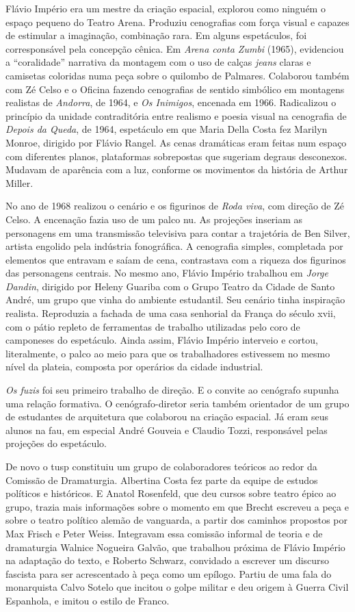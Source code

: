 Flávio Império era um mestre da criação espacial, explorou como ninguém
o espaço pequeno do Teatro Arena. Produziu cenografias com força visual
e capazes de estimular a imaginação, combinação rara. Em alguns
espetáculos, foi corresponsável pela concepção cênica. Em {\it Arena
conta Zumbi} (1965), evidenciou a “coralidade” narrativa da montagem com
o uso de calças {\it jeans} claras e camisetas coloridas numa peça sobre
o quilombo de Palmares. Colaborou também com Zé Celso e o Oficina
fazendo cenografias de sentido simbólico em montagens realistas de
{\it Andorra}, de 1964, e {\it Os Inimigos}, encenada em 1966.
Radicalizou o princípio da unidade contraditória entre realismo e poesia
visual na cenografia de {\it Depois da Queda}, de 1964, espetáculo em
que Maria Della Costa fez Marilyn Monroe, dirigido por Flávio Rangel. As
cenas dramáticas eram feitas num espaço com diferentes planos,
plataformas sobrepostas que sugeriam degraus desconexos. Mudavam de
aparência com a luz, conforme os movimentos da história de Arthur
Miller.

No ano de 1968 realizou o cenário e os figurinos de {\it Roda viva}, com
direção de Zé Celso. A encenação fazia uso de um palco nu. As projeções
inseriam as personagens em uma transmissão televisiva para contar a
trajetória de Ben Silver, artista engolido pela indústria fonográfica. A
cenografia simples, completada por elementos que entravam e saíam de
cena, contrastava com a riqueza dos figurinos das personagens centrais.
No mesmo ano, Flávio Império trabalhou em {\it Jorge Dandin}, dirigido
por Heleny Guariba com o Grupo Teatro da Cidade de Santo André, um grupo
que vinha do ambiente estudantil. Seu cenário tinha inspiração realista.
Reproduzia a fachada de uma casa senhorial da França do século {\sc xvii}, com
o pátio repleto de ferramentas de trabalho utilizadas pelo coro de
camponeses do espetáculo. Ainda assim, Flávio Império interveio e
cortou, literalmente, o palco ao meio para que os trabalhadores
estivessem no mesmo nível da plateia, composta por operários da cidade
industrial.

{\it Os fuzis} foi seu primeiro trabalho de direção. E o convite ao
cenógrafo supunha uma relação formativa. O cenógrafo-diretor seria
também orientador de um grupo de estudantes de arquitetura que colaborou
na criação espacial. Já eram seus alunos na {\sc fau}, em especial André
Gouveia e Claudio Tozzi, responsável pelas projeções do espetáculo.

De novo o {\sc tusp} constituiu um grupo de colaboradores teóricos ao redor da
Comissão de Dramaturgia. Albertina Costa fez parte da equipe de estudos
políticos e históricos. E Anatol Rosenfeld, que deu cursos sobre teatro
épico ao grupo, trazia mais informações sobre o momento em que Brecht
escreveu a peça e sobre o teatro político alemão de vanguarda, a partir
dos caminhos propostos por Max Frisch e Peter Weiss. Integravam essa
comissão informal de teoria e de dramaturgia Walnice Nogueira Galvão,
que trabalhou próxima de Flávio Império na adaptação do texto, e Roberto
Schwarz, convidado a escrever um discurso fascista para ser acrescentado
à peça como um epílogo. Partiu de uma fala do monarquista Calvo Sotelo
que incitou o golpe militar e deu origem à Guerra Civil Espanhola, e
imitou o estilo de Franco.

